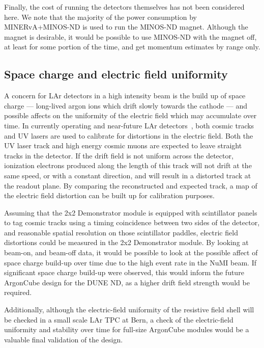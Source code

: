 Finally, the cost of running the detectors themselves has not been considered here. We note that the majority of the power consumption by MINERvA+MINOS-ND is used to run the MINOS-ND magnet. Although the magnet is desirable, it would be possible to use MINOS-ND with the magnet off, at least for some portion of the time, and get momentum estimates by range only.




\subsection{Space charge and electric field uniformity}
\label{sec:efield}
A concern for LAr detectors in a high intensity beam is the build up of space charge --- long-lived argon ions which drift slowly towards the cathode --- and possible affects on the uniformity of the electric field which may accumulate over time. In currently operating and near-future LAr detectors~\cite{Ereditato:2014lra, Antonello:2015lea}, both cosmic tracks and UV lasers are used to calibrate for distortions in the electric field. Both the UV laser track and high energy cosmic muons are expected to leave straight tracks in the detector. If the drift field is not uniform across the detector, ionization electrons produced along the length of this track will not drift at the same speed, or with a constant direction, and will result in a distorted track at the readout plane. By comparing the reconstructed and expected track, a map of the electric field distortion can be built up for calibration purposes.

Assuming that the 2x2 Demonstrator module is equipped with scintillator panels to tag cosmic tracks using a timing coincidence between two sides of the detector, and reasonable spatial resolution on those scintillator paddles, electric field distortions could be measured in the 2x2 Demonstrator module. By looking at beam-on, and beam-off data, it would be possible to look at the possible affect of space charge build-up over time due to the high event rate in the NuMI beam. If significant space charge build-up were observed, this would inform the future ArgonCube design for the DUNE ND, as a higher drift field strength would be required.

Additionally, although the electric-field uniformity of the resistive field shell will be checked in a small scale LAr TPC at Bern, a check of the electric-field uniformity and stability over time for full-size ArgonCube modules would be a valuable final validation of the design.


